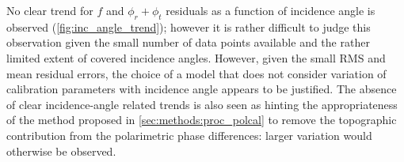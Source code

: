 No clear trend for $f$ and $\phi_r + \phi_t$ residuals as a function of incidence angle is observed (\autoref{fig:inc_angle_trend}); however it is rather difficult to judge this observation given the small number of data points available and the rather limited extent of covered incidence angles. However, given the small RMS and mean residual errors, the choice of a model that does not consider variation of calibration parameters with incidence angle appears to be justified. The absence of clear incidence-angle related trends is also seen as hinting the appropriateness of the method proposed in \autoref{sec:methods:proc_polcal} to remove the topographic contribution from the polarimetric phase differences: larger variation would otherwise be observed.\\
